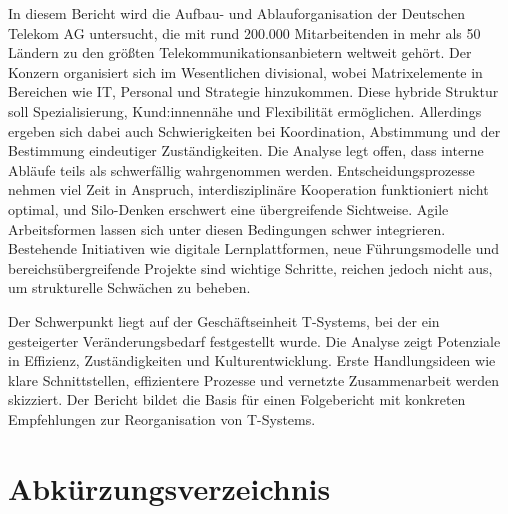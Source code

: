 \documentclass[12pt,a4paper]{article}
\begin{document}
	In diesem Bericht wird die Aufbau- und Ablauforganisation der Deutschen
	Telekom AG untersucht, die mit rund 200.000 Mitarbeitenden in mehr als
	50 Ländern zu den größten Telekommunikationsanbietern weltweit gehört.
	Der Konzern organisiert sich im Wesentlichen divisional, wobei
	Matrixelemente in Bereichen wie IT, Personal und Strategie hinzukommen.
	Diese hybride Struktur soll Spezialisierung, Kund:innennähe und
	Flexibilität ermöglichen. Allerdings ergeben sich dabei auch
	Schwierigkeiten bei Koordination, Abstimmung und der Bestimmung
	eindeutiger Zuständigkeiten. Die Analyse legt offen, dass interne
	Abläufe teils als schwerfällig wahrgenommen werden.
	Entscheidungsprozesse nehmen viel Zeit in Anspruch, interdisziplinäre
	Kooperation funktioniert nicht optimal, und Silo-Denken erschwert eine
	übergreifende Sichtweise. Agile Arbeitsformen lassen sich unter diesen
	Bedingungen schwer integrieren. Bestehende Initiativen wie digitale
	Lernplattformen, neue Führungsmodelle und bereichsübergreifende Projekte
	sind wichtige Schritte, reichen jedoch nicht aus, um strukturelle
	Schwächen zu beheben.
	
	\noindent Der Schwerpunkt liegt auf der Geschäftseinheit T-Systems, bei der ein
	gesteigerter Veränderungsbedarf festgestellt wurde. Die Analyse zeigt
	Potenziale in Effizienz, Zuständigkeiten und Kulturentwicklung. Erste
	Handlungsideen wie klare Schnittstellen, effizientere Prozesse und
	vernetzte Zusammenarbeit werden skizziert. Der Bericht bildet die Basis
	für einen Folgebericht mit konkreten Empfehlungen zur Reorganisation von
	T-Systems.
	
	
	\newpage
	\tableofcontents
	\newpage
	
	\listoffigures
	\newpage
	
	\listoftables
	\newpage
	
	\section*{Abkürzungsverzeichnis}
	\begin{acronym}[IT]
	\end{acronym}
	\newpage
	
\end{document}
